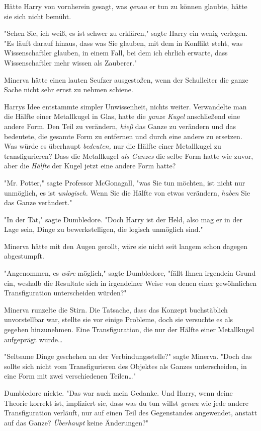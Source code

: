 {Hätte Harry von vornherein gesagt, was \emph{genau} er tun zu können glaubte, hätte sie sich nicht bemüht.

"Sehen Sie, ich weiß, es ist schwer zu erklären," sagte Harry ein wenig verlegen. "Es läuft darauf hinaus, dass was Sie glauben, mit dem in Konflikt steht, was Wissenschaftler glauben, in einem Fall, bei dem ich ehrlich erwarte, dass Wissenschaftler mehr wissen als Zauberer."

Minerva hätte einen lauten Seufzer ausgestoßen, wenn der Schulleiter die ganze Sache nicht sehr ernst zu nehmen schiene.

Harrys Idee entstammte simpler Unwissenheit, nichts weiter. Verwandelte man die Hälfte einer Metallkugel in Glas, hatte die \emph{ganze Kugel} anschließend eine andere Form. Den Teil zu verändern, \emph{hieß} das Ganze zu verändern und das bedeutete, die gesamte Form zu entfernen und durch eine andere zu ersetzen. Was würde es überhaupt \emph{bedeuten,} nur die Hälfte einer Metallkugel zu transfigurieren? Dass die Metallkugel \emph{als Ganzes} die selbe Form hatte wie zuvor, aber die \emph{Hälfte} der Kugel jetzt eine andere Form hatte?

"Mr. Potter," sagte Professor McGonagall, "was Sie tun möchten, ist nicht nur unmöglich, es ist \emph{unlogisch.} Wenn Sie die Hälfte von etwas verändern, \emph{haben} Sie das Ganze verändert."

"In der Tat," sagte Dumbledore. "Doch Harry ist der Held, also mag er in der Lage sein, Dinge zu bewerkstelligen, die logisch unmöglich sind."

Minerva hätte mit den Augen gerollt, wäre sie nicht seit langem schon dagegen abgestumpft.

"Angenommen, es \emph{wäre} möglich," sagte Dumbledore, "fällt Ihnen irgendein Grund ein, weshalb die Resultate sich in irgendeiner Weise von denen einer gewöhnlichen Transfiguration unterscheiden würden?"

Minerva runzelte die Stirn. Die Tatsache, dass das Konzept buchstäblich unvorstellbar war, stellte sie vor einige Probleme, doch sie versuchte es als gegeben hinzunehmen. Eine Transfiguration, die nur der Hälfte einer Metallkugel aufgeprägt wurde…

"Seltsame Dinge geschehen an der Verbindungsstelle?" sagte Minerva. "Doch das sollte sich nicht vom Transfigurieren des Objektes als Ganzes unterscheiden, in eine Form mit zwei verschiedenen Teilen…"

Dumbledore nickte. "Das war auch mein Gedanke. Und Harry, wenn deine Theorie korrekt ist, impliziert sie, dass was du tun willst \emph{genau} wie jede andere Transfiguration verläuft, nur auf einen Teil des Gegenstandes angewendet, anstatt auf das Ganze? \emph{Überhaupt} keine Änderungen?"

}
